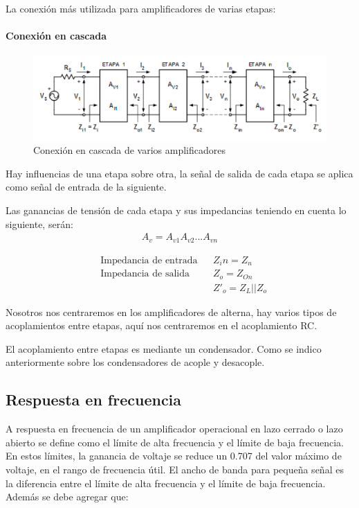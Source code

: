 La conexión más utilizada para amplificadores de varias etapas:

\paragraph{\textbf{Conexión en cascada}}

\begin{figure}[H]
    \centering
    \includegraphics[width=15cm]{Imagenes/amp_base.png}
    \caption{Conexión en cascada de varios amplificadores}
    \label{fig:cascada}
\end{figure}

Hay influencias de una etapa sobre otra, la señal de salida de cada etapa se aplica como señal de entrada de la siguiente.

Las ganancias de tensión de cada etapa y sus impedancias teniendo en cuenta lo siguiente, serán:
\begin{gather}
    A_v= A_{v1}A_{v2}...A_{vn}
    \label{eqn:avt}
\end{gather}

\begin{align*}
     & \text{Impedancia de entrada} &  & Z_in= Z_n        \\
     & \text{Impedancia de salida}  &  & Z_o= Z_{On}      \\
     &                              &  & Z'_o= Z_{L}||Z_o
\end{align*}

Nosotros nos centraremos en los amplificadores de alterna, hay varios tipos de acoplamientos entre etapas, aquí nos centraremos en el acoplamiento RC.

El acoplamiento entre etapas es mediante un condensador. Como se indico anteriormente sobre los condensadores de acople y desacople.

\newpage

\subsection{Respuesta en frecuencia}

A respuesta en frecuencia de un amplificador operacional en lazo cerrado o lazo abierto se define como el límite de alta frecuencia y el límite de baja frecuencia. En estos límites, la ganancia de voltaje se reduce un 0.707 del valor máximo de voltaje, en el rango de frecuencia útil.
El ancho de banda para pequeña señal es la diferencia entre el límite de alta frecuencia y el límite de baja frecuencia. Además se debe agregar que:

